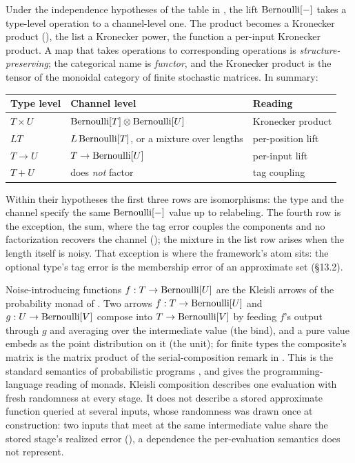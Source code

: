 Under the independence hypotheses of the table in
, the lift $\mathrm{Bernoulli}[-]$ takes a type-level
operation to a channel-level one. The product becomes a Kronecker product
(), the list a Kronecker power, the function a
per-input Kronecker product. A map that takes operations to corresponding
operations is \emph{structure-preserving}; the categorical name is
\emph{functor}, and the Kronecker product is the tensor of the monoidal category
of finite stochastic matrices. In summary:
\begin{center}
\small
\begin{tabular}{@{}lll@{}}
\hline
Type level & Channel level & Reading \\
\hline
$T \times U$ & $\mathrm{Bernoulli}[T] \otimes \mathrm{Bernoulli}[U]$ & Kronecker product \\
$L T$ & $L\, \mathrm{Bernoulli}[T]$, or a mixture over lengths & per-position lift \\
$T \to U$ & $T \to \mathrm{Bernoulli}[U]$ & per-input lift \\
$T + U$ & does \emph{not} factor & tag coupling \\
\hline
\end{tabular}
\end{center}
Within their hypotheses the first three rows are isomorphisms: the type and the
channel specify the same $\mathrm{Bernoulli}[-]$ value up to relabeling. The fourth row
is the exception, the sum, where the tag error couples the components and no
factorization recovers the channel (); the mixture in the
list row arises when the length itself is noisy. That exception is where the framework's
atom sits: the optional type's tag error is the membership error of an
approximate set (\S13.2).

\begin{remark}
\label{rem:monad}
Noise-introducing functions $f : T \to \mathrm{Bernoulli}[U]$ are the Kleisli arrows of
the probability monad of \textcite{giry-1982}. Two arrows
$f : T \to \mathrm{Bernoulli}[U]$ and $g : U \to \mathrm{Bernoulli}[V]$ compose into $T \to
\mathrm{Bernoulli}[V]$ by feeding $f$'s output through $g$ and averaging over the
intermediate value (the bind), and a pure value embeds as the point distribution
on it (the unit); for finite types the composite's matrix is the matrix
product of the serial-composition remark in . This is the standard semantics of probabilistic
programs \parencite{kozen-1981,ramsey-pfeffer-2002}, and \textcite{wadler-1992}
gives the programming-language reading of monads. Kleisli composition describes
one evaluation with fresh randomness at every stage. It does not describe a
stored approximate function queried at several inputs, whose randomness was drawn
once at construction: two inputs that meet at the same intermediate value share
the stored stage's realized error (), a dependence
the per-evaluation semantics does not represent.
\end{remark}

